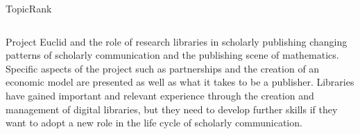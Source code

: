 \begin{frame}[label=topicrank]{TopicRank}
\begin{columns}
\begin{column}{.55\textwidth}
{\begin{exampleblock}{\footnotesize Project Euclid and the role of
                                 research libraries in scholarly publishing}
              changing patterns of scholarly communication and the publishing
              scene of mathematics. Specific aspects of the project such as
              partnerships and the creation of an economic model are presented
              as well as what it takes to be a publisher. Libraries have gained
              important and relevant experience through the creation and
              management of digital libraries, but they need to develop further
              skills if they want to adopt a new role in the life cycle of
              scholarly communication.
            \end{exampleblock}
          }
        \endminipage
      \end{column}
    \end{columns}
  \end{frame}

